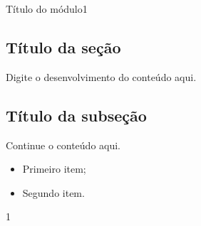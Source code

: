 \documentclass{article}
\begin{document}

\begin{altitudemodulo}{Título do módulo}{1}


\begin{conteudo}

\section{Título da seção}

Digite o desenvolvimento do conteúdo aqui.

\subsection{Título da subseção}

Continue o conteúdo aqui.

\begin{itemize}
    \item Primeiro item;
    \item Segundo item.
\end{itemize}

\end{conteudo}


\begin{altitudequestao}{1}
\end{altitudequestao}

\end{altitudemodulo}
\end{document}
